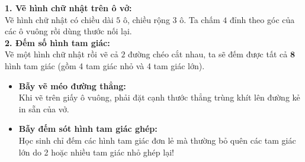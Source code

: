 \documentclass[12pt,a4paper]{article}
\begin{document}
\vspace{-2.5mm}
\noindent
\begin{minipage}[t]{0.49\textwidth}\vspace{0pt}
\begin{tcolorbox}[
  enhanced,
  colback=green!4!white,
  colframe=green!60!black,
  arc=2mm, boxrule=0.8pt,
  left=2mm, right=2mm, top=1.8mm, bottom=1.8mm,
  title={\footnotesize\bfseries\color{white}\faCheckCircle\ Ví dụ thực hành chuẩn mực}
]
{\footnotesize
\textbf{1. Vẽ hình chữ nhật trên ô vở:}\\
Vẽ hình chữ nhật có chiều dài $5$ ô, chiều rộng $3$ ô. Ta chấm $4$ đỉnh theo góc của các ô vuông rồi dùng thước nối lại.\\
\textbf{2. Đếm số hình tam giác:}\\
Vẽ một hình chữ nhật rồi vẽ cả $2$ đường chéo cắt nhau, ta sẽ đếm được tất cả $\mathbf{8}$ hình tam giác (gồm 4 tam giác nhỏ và 4 tam giác lớn).
}
\end{tcolorbox}
\end{minipage}
\hfill
\begin{minipage}[t]{0.49\textwidth}\vspace{0pt}
\begin{tcolorbox}[
  enhanced,
  colback=red!4!white,
  colframe=red!70!black,
  arc=2mm, boxrule=0.8pt,
  left=2mm, right=2mm, top=1.8mm, bottom=1.8mm,
  title={\footnotesize\bfseries\color{white}\faExclamationTriangle\ Mẹo tránh bẫy trắc nghiệm}
]
{\footnotesize
\begin{itemize}\setlength{\itemsep}{1.5pt}\setlength{\leftskip}{-2.5mm}
  \item \textbf{Bẫy vẽ méo đường thẳng:}\\
  Khi vẽ trên giấy ô vuông, phải đặt cạnh thước thẳng trùng khít lên đường kẻ in sẵn của vở.
  \item \textbf{Bẫy đếm sót hình tam giác ghép:}\\
  Học sinh chỉ đếm các hình tam giác đơn lẻ mà thường bỏ quên các tam giác lớn do 2 hoặc nhiều tam giác nhỏ ghép lại!
\end{itemize}
}
\end{tcolorbox}
\end{minipage}
\end{document}
